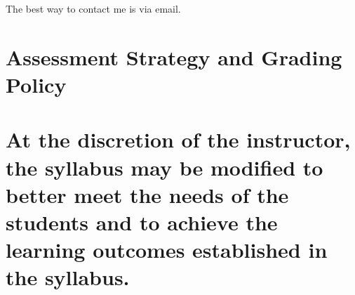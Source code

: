 \documentclass[12pt]{article}
\begin{document}
The best way to contact me is via email.

\section*{Assessment Strategy and Grading Policy}


\newpage

\section*{At the discretion of the instructor, the syllabus may be modified to better meet the needs of the students and to achieve the learning outcomes established in the syllabus.}
\end{document}
